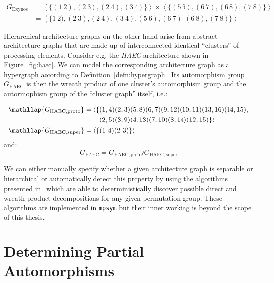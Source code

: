 \begin{align*}
  G_{\mathrm{Exynos}} &=
      \left<\{(1\ 2), (2\ 3), (2\ 4), (3\ 4)\}\right>
        \times
      \left<\{(5\ 6), (6\ 7), (6\ 8), (7\ 8)\}\right> \\
    &= \left<\{1\ 2), (2\ 3), (2\ 4), (3\ 4), (5\ 6), (6\ 7), (6\ 8), (7\ 8)\}\right>
\end{align*}

\noindent
Hierarchical architecture graphs on the other hand arise from abstract
architecture graphs that are made up of interconnected identical ``clusters''
of processing elements. Consider e.g. the \textit{HAEC} architecture shown in
Figure~\ref{fig:haec}. We can model the corresponding architecture graph as a
hypergraph according to Definition~\ref{defn:hypergraph}. Its automorphism
group $G_{\mathrm{HAEC}}$ is then the wreath product of one cluster's
automorphism group and the autormophism group of the ``cluster graph'' itself,
i.e.:

\begin{align*}
  &\begin{aligned}
    \mathllap{G_{\mathrm{HAEC,proto}}} =
      \langle\{&(1, 4)(2, 3)(5, 8)(6, 7)(9, 12)(10, 11)(13, 16)(14, 15), \\
               &(2, 5)(3, 9)(4, 13)(7, 10)(8, 14)(12, 15)\}\rangle
    \end{aligned} \\
  &\mathllap{G_{\mathrm{HAEC,super}}} = \left<\{(1\ 4)(2\ 3)\}\right> \\
\end{align*}
%
and:
%
\begin{equation*}
  G_{\mathrm{HAEC}} = G_{\mathrm{HAEC,proto}} \wr G_{\mathrm{HAEC,super}}
\end{equation*}

\noindent
We can either manually specify whether a given architecture graph is separable
or hierarchical or automatically detect this property by using the algorithms
presented in~\cite{Donaldson} which are able to deterministically discover
possible direct and wreath product decompositions for any given permutation
group. These algorithms are implemented in \texttt{mpsym} but their inner
working is beyond the scope of this thesis.

\section{Determining Partial Automorphisms}
\label{sec:ag_determining_partial_automorphisms}

